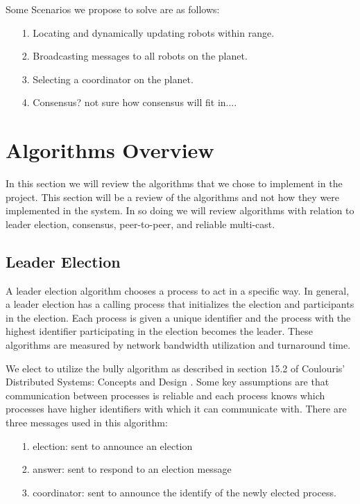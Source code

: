 \documentclass[10pt,letterpaper]{article}
\begin{document}
Some Scenarios we propose to solve are as follows:
\begin{enumerate}
    \item [1.] Locating and dynamically updating robots within range. 
    \item [2.] Broadcasting messages to all robots on the planet.
    \item [3.] Selecting a coordinator on the planet.
    \item [4.] Consensus? not sure how consensus will fit in....
\end{enumerate}
\section{Algorithms Overview}\label{Section:algs}
In this section we will review the algorithms that we chose to implement in the project. This section will be a review of the algorithms and not how they were implemented in the system. In so doing we will review algorithms with relation to leader election, consensus, peer-to-peer, and reliable multi-cast.

\subsection{Leader Election} \label{subsection:bully}
A leader election algorithm chooses a process to act in a specific way. In general, a leader election has a calling process that initializes the election and participants in the election. Each process is given a unique identifier and the process with the highest identifier participating in the election becomes the leader. These algorithms are measured by network bandwidth utilization and turnaround time.

We elect to utilize the bully algorithm as described in section 15.2 of Coulouris' Distributed Systems: Concepts and Design \cite{Coulouris5}. Some key assumptions are that communication between processes is reliable and each process knows which processes have higher identifiers with which it can communicate with. There are three messages used in this algorithm:
\begin{enumerate}
    \item [1.] election: sent to announce an election
    \item [2.] answer: sent to respond to an election message
    \item [3.] coordinator: sent to announce the identify of the newly elected process.
\end{enumerate}
\end{document}
